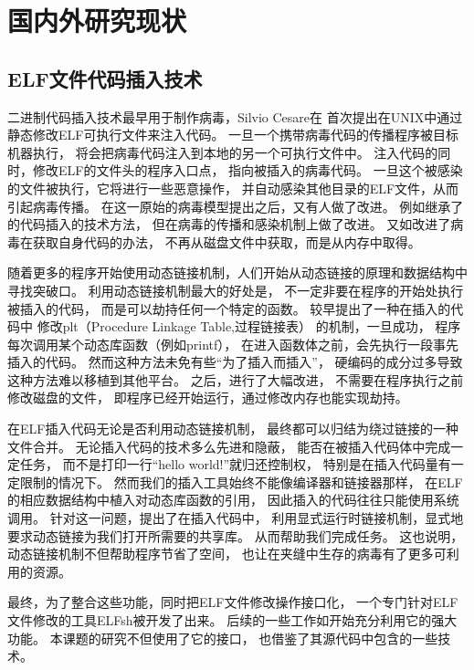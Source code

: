 \section{国内外研究现状}

\subsection{ELF文件代码插入技术}

二进制代码插入技术最早用于制作病毒，Silvio Cesare在\cite{silvio}
首次提出在UNIX中通过静态修改ELF可执行文件来注入代码。
一旦一个携带病毒代码的传播程序被目标机器执行，
将会把病毒代码注入到本地的另一个可执行文件中。
注入代码的同时，修改ELF的文件头的程序入口点，
指向被插入的病毒代码。
一旦这个被感染的文件被执行，它将进行一些恶意操作，
并自动感染其他目录的ELF文件，从而引起病毒传播。
在这一原始的病毒模型提出之后，又有人做了改进。
例如\cite{simple}继承了\cite{silvio}的代码插入的技术方法，
但在病毒的传播和感染机制上做了改进。
又如\cite{prototype}改进了病毒在获取自身代码的办法，
不再从磁盘文件中获取，而是从内存中取得。


随着更多的程序开始使用动态链接机制，人们开始从动态链接的原理和数据结构中
寻找突破口。
利用动态链接机制最大的好处是，
不一定非要在程序的开始处执行被插入的代码，
而是可以劫持任何一个特定的函数。
\cite{sharelib}较早提出了一种在插入的代码中
修改plt（Procedure Linkage Table,过程链接表）
的机制，一旦成功，
程序每次调用某个动态库函数（例如printf），
在进入函数体之前，会先执行一段事先插入的代码。
然而这种方法未免有些“为了插入而插入”，
硬编码的成分过多导致这种方法难以移植到其他平台。
之后，\cite{modern}进行了大幅改进，
不需要在程序执行之前修改磁盘的文件，
即程序已经开始运行，通过修改内存也能实现劫持。

在ELF插入代码无论是否利用动态链接机制，
最终都可以归结为绕过链接的一种文件合并。
无论插入代码的技术多么先进和隐蔽，
能否在被插入代码体中完成一定任务，
而不是打印一行“hello world!”就归还控制权，
特别是在插入代码量有一定限制的情况下。
然而我们的插入工具始终不能像编译器和链接器那样，
在ELF的相应数据结构中植入对动态库函数的引用，
因此插入的代码往往只能使用系统调用。
针对这一问题，\cite{subversive}提出了在插入代码中，
利用显式运行时链接机制，显式地要求动态链接为我们打开所需要的共享库。
从而帮助我们完成任务。
这也说明，动态链接机制不但帮助程序节省了空间，
也让在夹缝中生存的病毒有了更多可利用的资源。


最终，为了整合这些功能，同时把ELF文件修改操作接口化，
一个专门针对ELF文件修改的工具ELFsh被开发了出来。
后续的一些工作如\cite{cerberus}开始充分利用它的强大功能。
本课题的研究不但使用了它的接口，
也借鉴了其源代码中包含的一些技术。


